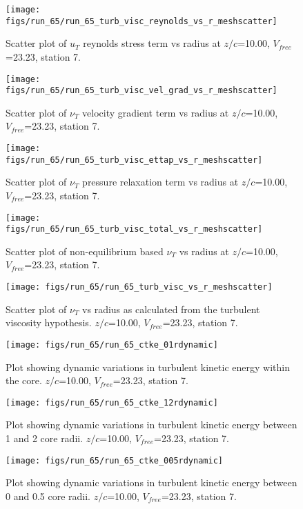 \begin{figure}[H]
\centering
\texttt{[image: figs/run\_65/run\_65\_turb\_visc\_reynolds\_vs\_r\_meshscatter]}
\caption{Scatter plot of $
u_T$ reynolds stress term vs radius at $z/c$=10.00, $V_{free}$=23.23, station 7.}
\end{figure}


\begin{figure}[H]
\centering
\texttt{[image: figs/run\_65/run\_65\_turb\_visc\_vel\_grad\_vs\_r\_meshscatter]}
\caption{Scatter plot of $\nu_T$ velocity gradient term vs radius at $z/c$=10.00, $V_{free}$=23.23, station 7.}
\end{figure}


\begin{figure}[H]
\centering
\texttt{[image: figs/run\_65/run\_65\_turb\_visc\_ettap\_vs\_r\_meshscatter]}
\caption{Scatter plot of $\nu_T$ pressure relaxation term vs radius at $z/c$=10.00, $V_{free}$=23.23, station 7.}
\end{figure}


\begin{figure}[H]
\centering
\texttt{[image: figs/run\_65/run\_65\_turb\_visc\_total\_vs\_r\_meshscatter]}
\caption{Scatter plot of non-equilibrium based $\nu_T$ vs radius at $z/c$=10.00, $V_{free}$=23.23, station 7.}
\end{figure}


\begin{figure}[H]
\centering
\texttt{[image: figs/run\_65/run\_65\_turb\_visc\_vs\_r\_meshscatter]}
\caption{Scatter plot of $\nu_T$ vs radius as calculated from the turbulent viscosity hypothesis. $z/c$=10.00, $V_{free}$=23.23, station 7.}
\end{figure}


\begin{figure}[H]
\centering
\texttt{[image: figs/run\_65/run\_65\_ctke\_01rdynamic]}
\caption{Plot showing dynamic variations in turbulent kinetic energy within the core. $z/c$=10.00, $V_{free}$=23.23, station 7.}
\end{figure}


\begin{figure}[H]
\centering
\texttt{[image: figs/run\_65/run\_65\_ctke\_12rdynamic]}
\caption{Plot showing dynamic variations in turbulent kinetic energy between 1 and 2 core radii. $z/c$=10.00, $V_{free}$=23.23, station 7.}
\end{figure}


\begin{figure}[H]
\centering
\texttt{[image: figs/run\_65/run\_65\_ctke\_005rdynamic]}
\caption{Plot showing dynamic variations in turbulent kinetic energy between 0 and 0.5 core radii. $z/c$=10.00, $V_{free}$=23.23, station 7.}
\end{figure}


